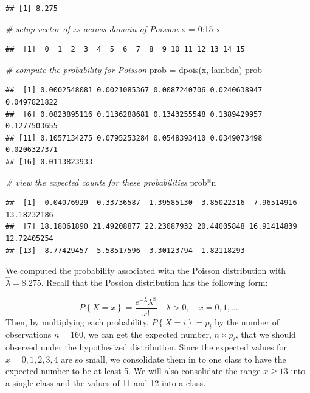 \documentclass[
]{book}
\newenvironment{Shaded}{\begin{snugshade}}{\end{snugshade}}
\newcommand{\CommentTok}[1]{\textcolor[rgb]{0.56,0.35,0.01}{\textit{#1}}}
\newcommand{\DecValTok}[1]{\textcolor[rgb]{0.00,0.00,0.81}{#1}}
\newcommand{\FunctionTok}[1]{\textcolor[rgb]{0.00,0.00,0.00}{#1}}
\newcommand{\NormalTok}[1]{#1}
\newcommand{\OtherTok}[1]{\textcolor[rgb]{0.56,0.35,0.01}{#1}}
\newcommand{\SpecialCharTok}[1]{\textcolor[rgb]{0.00,0.00,0.00}{#1}}
\theoremstyle{definition}
\theoremstyle{definition}
\theoremstyle{definition}
\theoremstyle{definition}
\theoremstyle{remark}
\begin{document}
\begin{verbatim}
## [1] 8.275
\end{verbatim}

\begin{Shaded}
\begin{Highlighting}[]
\CommentTok{\# setup vector of x\textquotesingle{}s across domain of Poisson}
\NormalTok{x }\OtherTok{=} \DecValTok{0}\SpecialCharTok{:}\DecValTok{15}
\NormalTok{x}
\end{Highlighting}
\end{Shaded}

\begin{verbatim}
##  [1]  0  1  2  3  4  5  6  7  8  9 10 11 12 13 14 15
\end{verbatim}

\begin{Shaded}
\begin{Highlighting}[]
\CommentTok{\# compute the probability for Poisson}
\NormalTok{prob }\OtherTok{=} \FunctionTok{dpois}\NormalTok{(x, lambda)}
\NormalTok{prob}
\end{Highlighting}
\end{Shaded}

\begin{verbatim}
##  [1] 0.0002548081 0.0021085367 0.0087240706 0.0240638947 0.0497821822
##  [6] 0.0823895116 0.1136288681 0.1343255548 0.1389429957 0.1277503655
## [11] 0.1057134275 0.0795253284 0.0548393410 0.0349073498 0.0206327371
## [16] 0.0113823933
\end{verbatim}

\begin{Shaded}
\begin{Highlighting}[]
\CommentTok{\# view the expected counts for these probabilities}
\NormalTok{prob}\SpecialCharTok{*}\NormalTok{n}
\end{Highlighting}
\end{Shaded}

\begin{verbatim}
##  [1]  0.04076929  0.33736587  1.39585130  3.85022316  7.96514916 13.18232186
##  [7] 18.18061890 21.49208877 22.23087932 20.44005848 16.91414839 12.72405254
## [13]  8.77429457  5.58517596  3.30123794  1.82118293
\end{verbatim}

We computed the probability associated with the Poisson distribution with \(\hat{\lambda} = 8.275\). Recall that the Possion distribution has the following form:

\[
P\left\{X=x\right\} = \frac{e^{-\lambda}\lambda^{x}}{x!} \quad \lambda > 0, \quad x = 0, 1, \ldots
\]
Then, by multiplying each probability, \(P\left\{X=i\right\} = p_i\) by the number of observations \(n=160\), we can get the expected number, \(n\times p_i\), that we should observed under the hypothesized distribution. Since the expected values for \(x = 0, 1, 2, 3, 4\) are so small, we consolidate them in to one class to have the expected number to be at least 5. We will also consolidate the range \(x \geq 13\) into a single class and the values of 11 and 12 into a class.
\end{document}
